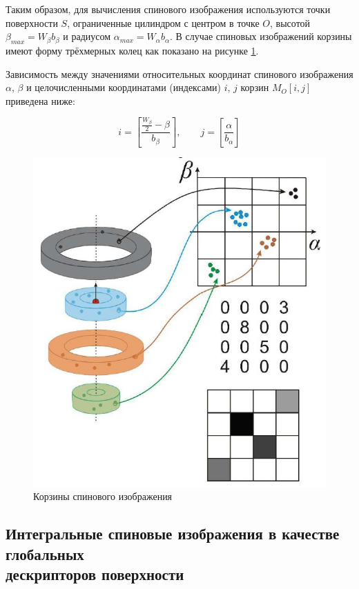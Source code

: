 \documentclass[14pt]{article}
\numberwithin{figure}{section}
\numberwithin{equation}{section}
\begin{document}
Таким образом, для вычисления спинового изображения используются точки поверхности $S$, ограниченные цилиндром с центром в точке $O$, высотой $\beta_{max} = W_{\beta}b_{\beta}$ и радиусом $\alpha_{max} = W_{\alpha} b_{\alpha}$. В случае спиновых изображений корзины имеют форму трёхмерных колец как показано на рисунке \ref{ris:3}.

Зависимость между значениями относительных координат спинового изображения $\alpha$, $\beta$ и целочисленными координатами (индексами) $i$, $j$ корзин $M_O[i, j]$ приведена ниже:

\begin{equation}
	i = \left[ \frac{\frac{W_{\beta}}{2} - \beta}{b_{\beta}} \right], \qquad j = \left[ \frac{\alpha}{b_{\alpha}} \right]
\end{equation}

\begin{figure}[h]
	\begin{center}
		\includegraphics[scale=0.7]{3.JPG}
		\caption{Корзины спинового изображения}
		\label{ris:3}
	\end{center}
\end{figure}

\subsection{Интегральные спиновые изображения в качестве глобальных \\дескрипторов поверхности}
\end{document}
